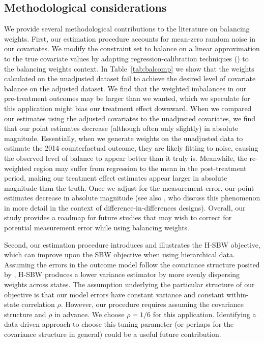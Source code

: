 \documentclass[aoas]{imsart}
\theoremstyle{plain}
\theoremstyle{remark}
\begin{document}
\subsection{Methodological considerations}

We provide several methodological contributions to the literature on balancing weights. First, our estimation procedure accounts for mean-zero random noise in our covariates. We modify the constraint set to balance on a linear approximation to the true covariate values by adapting regression-calibration techniques (\cite{gleser1992importance}) to the balancing weights context. In Table~\ref{tab:balcomp} we show that the weights calculated on the unadjusted dataset fail to achieve the desired level of covariate balance on the adjusted dataset. We find that the weighted imbalances in our pre-treatment outcomes may be larger than we wanted, which we speculate for this application might bias our treatment effect downward. When we compared our estimates using the adjusted covariates to the unadjusted covariates, we find that our point estimates decrease (although often only slightly) in absolute magnitude. Essentially, when we generate weights on the unadjusted data to estimate the 2014 counterfactual outcome, they are likely fitting to noise, causing the observed level of balance to appear better than it truly is. Meanwhile, the re-weighted region may suffer from regression to the mean in the post-treatment period, making our treatment effect estimates appear larger in absolute magnitude than the truth. Once we adjust for the measurement error, our point estimates decrease in absolute magnitude (see also \cite{daw2018matching}, who discuss this phenomenon in more detail in the context of difference-in-differences designs). Overall, our study provides a roadmap for future studies that may wish to correct for potential measurement error while using balancing weights. 

Second, our estimation procedure introduces and illustrates the H-SBW objective, which can improve upon the SBW objective when using hierarchical data. Assuming the errors in the outcome model follow the covariance structure posited by \cite{kloek1981ols}, H-SBW produces a lower variance estimator by more evenly dispersing weights across states. The assumption underlying the particular structure of our objective is that our model errors have constant variance and constant within-state correlation $\rho$. However, our procedure requires assuming the covariance structure and $\rho$ in advance. We choose $\rho = 1/6$ for this application. Identifying a data-driven approach to choose this tuning parameter (or perhaps for the covariance structure in general) could be a useful future contribution. 
\end{document}
